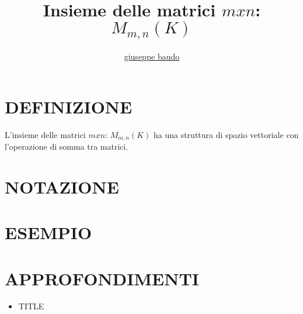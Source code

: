 \documentclass[a4paper,10pt]{article}
\title{Insieme delle matrici $mxn$: $M_{m,n}(K)$}
\author{\href{http://www.baudo.hol.es}{giuseppe baudo}}
\begin{document}
\maketitle

\section{DEFINIZIONE}
L'insieme delle matrici $mxn$: $M_{m,n}(K)$ ha una struttura di spazio vettoriale con l'operazione di somma tra matrici.
\section{NOTAZIONE}

\section{ESEMPIO}

\section{APPROFONDIMENTI}
\begin{itemize}
 \item TITLE
\end{itemize}
\end{document}
